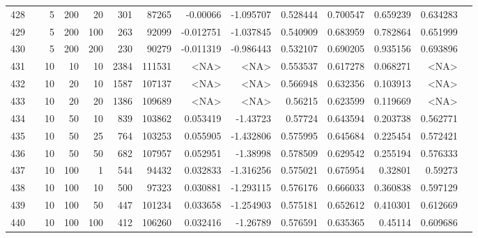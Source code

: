 \begin{longtable}{llrrrrrrrrrrrr}
		428 & &            5 &               200 &           20 &          301 &      87265 &  -0.00066 & -1.095707 &  0.528444 &    0.700547 &       0.659239 &  0.634283 \\
		429 & &            5 &               200 &          100 &          263 &      92099 & -0.012751 & -1.037845 &  0.540909 &    0.683959 &       0.782864 &  0.651999 \\
		430 & &            5 &               200 &          200 &          230 &      90279 & -0.011319 & -0.986443 &  0.532107 &    0.690205 &       0.935156 &  0.693896 \\
		431 & &           10 &                10 &           10 &           2384 &     111531 &      <NA> &      <NA> &  0.553537 &    0.617278 &       0.068271 &  <NA> \\
		432 & &           10 &                20 &           10 &           1587 &     107137 &      <NA> &      <NA> &  0.566948 &    0.632356 &       0.103913 &  <NA> \\
		433 & &           10 &                20 &           20 &           1386 &     109689 &      <NA> &      <NA> &   0.56215 &    0.623599 &       0.119669 &   <NA> \\
		434 & &           10 &                50 &           10 &         839 &     103862 &  0.053419 &  -1.43723 &   0.57724 &    0.643594 &       0.203738 &  0.562771 \\
		435 & &           10 &                50 &           25 &          764 &     103253 &  0.055905 & -1.432806 &  0.575995 &    0.645684 &       0.225454 &  0.572421 \\
		436 & &           10 &                50 &           50 &          682 &     107957 &  0.052951 &  -1.38998 &  0.578509 &    0.629542 &       0.255194 &  0.576333 \\
		437 & &           10 &               100 &            1 &          544 &      94432 &  0.032833 & -1.316256 &  0.575021 &    0.675954 &        0.32801 &   0.59273 \\
		438 & &           10 &               100 &           10 &          500 &      97323 &  0.030881 & -1.293115 &  0.576176 &    0.666033 &       0.360838 &  0.597129 \\
		439 & &           10 &               100 &           50 &          447 &     101234 &  0.033658 & -1.254903 &  0.575181 &    0.652612 &       0.410301 &  0.612669 \\
		440 & &           10 &               100 &          100 &          412 &     106260 &  0.032416 &  -1.26789 &  0.576591 &    0.635365 &        0.45114 &  0.609686 \\

\end{longtable}
